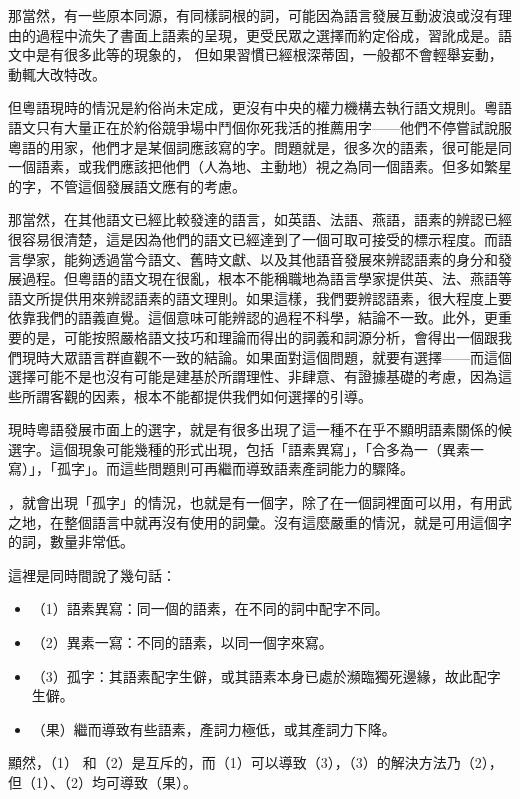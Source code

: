 \documentclass[a5paper, 10pt, openany]{book} %
\begin{document}
那當然，有一些原本同源，有同樣詞根的詞，可能因為語言發展互動波浪或沒有理由的過程中流失了書面上語素的呈現，更受民眾之選擇而約定俗成，習訛成是。語文中是有很多此等的現象的， 但如果習慣已經根深蒂固，一般都不會輕舉妄動，動輒大改特改。

但粵語現時的情況是約俗尚未定成，更沒有中央的權力機構去執行語文規則。粵語語文只有大量正在於約俗競爭場中鬥個你死我活的推薦用字——他們不停嘗試說服粵語的用家，他們才是某個詞應該寫的字。問題就是，很多次的語素，很可能是同一個語素，或我們應該把他們（人為地、主動地）視之為同一個語素。但多如繁星的字，不管這個發展語文應有的考慮。

那當然，在其他語文已經比較發達的語言，如英語、法語、燕語，語素的辨認已經很容易很清楚，這是因為他們的語文已經達到了一個可取可接受的標示程度。而語言學家，能夠透過當今語文、舊時文獻、以及其他語音發展來辨認語素的身分和發展過程。但粵語的語文現在很亂，根本不能稱職地為語言學家提供英、法、燕語等語文所提供用來辨認語素的語文理則。如果這樣，我們要辨認語素，很大程度上要依靠我們的語義直覺。這個意味可能辨認的過程不科學，結論不一致。此外，更重要的是，可能按照嚴格語文技巧和理論而得出的詞義和詞源分析，會得出一個跟我們現時大眾語言群直觀不一致的結論。如果面對這個問題，就要有選擇——而這個選擇可能不是也沒有可能是建基於所謂理性、非肆意、有證據基礎的考慮，因為這些所謂客觀的因素，根本不能都提供我們如何選擇的引導。 

現時粵語發展市面上的選字，就是有很多出現了這一種不在乎不顯明語素關係的候選字。這個現象可能幾種的形式出現，包括「語素異寫」，「合多為一（異素一寫）」，「孤字」。而這些問題則可再繼而導致語素產詞能力的驟降。

，就會出現「孤字」的情況，也就是有一個字，除了在一個詞裡面可以用，有用武之地，在整個語言中就再沒有使用的詞彙。沒有這麼嚴重的情況，就是可用這個字的詞，數量非常低。

這裡是同時間說了幾句話：

\begin{itemize}
  \item[]（1）語素異寫：同一個的語素，在不同的詞中配字不同。
  \item[]（2）異素一寫：不同的語素，以同一個字來寫。
  \item[]（3）孤字：其語素配字生僻，或其語素本身已處於瀕臨獨死邊緣，故此配字生僻。
  \item[]（果）繼而導致有些語素，產詞力極低，或其產詞力下降。
\end{itemize}


顯然，（1） 和（2）是互斥的，而（1）可以導致（3），（3）的解決方法乃（2），但（1）、（2）均可導致（果）。
\end{document}
